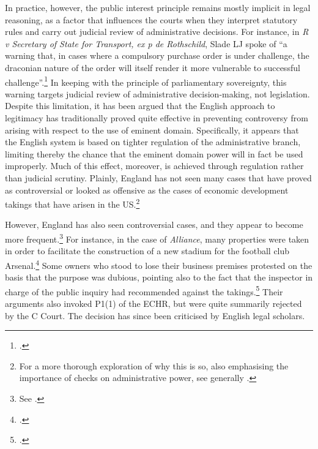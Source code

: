 In practice, however, the public interest principle remains mostly implicit in legal reasoning, as a factor that influences the courts when they interpret statutory rules and carry out judicial review of administrative decisions. %
For instance, in {\it R v Secretary of State for Transport, ex p de Rothschild}, Slade LJ spoke of ``a warning that, in cases where a compulsory purchase order is under challenge, the draconian nature of the order will itself render it more vulnerable to successful challenge''.\footcite[938]{rothschild89}
In keeping with the principle of parliamentary sovereignty, this warning targets judicial review of administrative decision-making, not legislation. Despite this limitation, it has been argued that the English approach to legitimacy has traditionally proved quite effective in preventing controversy from arising with respect to the use of eminent domain. Specifically, it appears that the English system is based on tighter regulation of the administrative branch, limiting thereby the chance that the eminent domain power will in fact be used improperly. Much of this effect, moreover, is achieved through regulation rather than judicial scrutiny. Plainly, England has not seen many cases that have proved as controversial or looked as offensive as the cases of economic development takings that have arisen in the US.\footnote{For a more thorough exploration of why this is so, also emphasising the importance of checks on administrative power, see generally \cite{allen08}.}

However, England has also seen controversial cases, and they appear to become more frequent.\footnote{See \cite{waring}.} For instance, in the case of {\it Alliance}, many properties were taken in order to facilitate the construction of a new stadium for the football club Arsenal.\footcite{alliance06} Some owners who stood to lose their business premises protested on the basis that the purpose was dubious, pointing also to the fact that the inspector in charge of the public inquiry had recommended against the takings.\footcite[6-7]{alliance06} Their arguments also invoked P1(1) of the ECHR, but were quite summarily rejected by the C Court. The decision has since been criticised by English legal scholars. 

